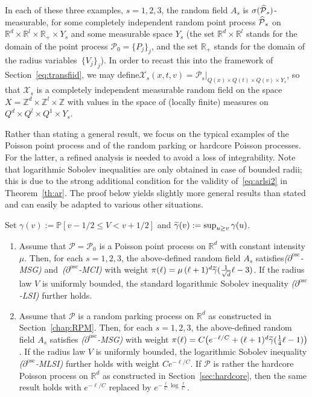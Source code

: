 \documentclass[10pt]{amsart}
\theoremstyle{definition}\newtheorem{defi}[theo]{Definition}\newtheorem{rema}[theo]{Remark}\newtheorem{exam}[theo]{Example}\newtheorem{exem}[theo]{Example}\newtheorem{nota}[theo]{Notation}
\newcommand{\R}{\mathbb R}
\newcommand{\Z}{\mathbb Z}
\newcommand{\p}{\mathbb{P}}
\newcommand{\X}{\mathcal X}
\newcommand{\Pc}{\mathcal P}
\newcommand{\osc}{\partial^{\mathrm{osc}}}
\newcommand*{\romanenumi}{\renewcommand*{\theenumi}{\roman{enumi}}}
\let\oldtilde\tilde
\renewcommand*{\tilde}[1]{\mathchoice{\widetilde{#1}}{\widetilde{#1}}{\oldtilde{#1}}{\oldtilde{#1}}}\let\oldhat\hat
\renewcommand*{\hat}[1]{\mathchoice{\widehat{#1}}{\widehat{#1}}{\oldhat{#1}}{\oldhat{#1}}}\let\oldexists\exists
\renewcommand*{\exists}{\mathrel{\oldexists}}
\begin{document}
In each of these three examples, $s=1,2,3$, the random field $A_s$ is $\sigma(\hat\Pc_s)$-measurable, for some completely independent random point process $\hat\Pc_s$ on $\R^d\times \R^l\times\R_+\times Y_s$ and some measurable space $Y_s$ (the set $\R^d\times\R^l$ stands for the domain of the point process $\Pc_0=\{P_j\}_j$, and the set $\R_+$ stands for the domain of the radius variables~$\{V_j\}_j$). In order to recast this into the framework of Section~\ref{eq:transfiid}, we may define\linebreak$\X_s(x,t,v)=\Pc_s|_{Q(x)\times Q(t)\times Q(v)\times Y_s}$, so that $\X_s$ is a completely independent measurable random field on the space $X=\Z^d\times \Z^l\times\Z$ with values in the space of (locally finite) measures on $Q^d\times Q^l\times Q^1\times Y_s$.


Rather than stating a general result, we focus on the typical examples of the Poisson point process and of the random parking or hardcore Poisson processes. For the latter, a refined analysis is needed to avoid a loss of integrability. Note that logarithmic Sobolev inequalities are only obtained in case of bounded radii; this is due to the strong additional condition for the validity of~\eqref{eq:arlsi2} in Theorem~\ref{th:ar}. The proof below yields slightly more general results than stated and can easily be adapted to various other situations. 


\begin{prop}\label{prop:genincl-loss}
Set $\gamma(v):=\p[v-1/2\le V< v+1/2]$ and $\tilde\gamma(v)\linebreak:=\sup_{u\ge v}\gamma(u)$.
\begin{enumerate}\romanenumi
\item \label{prop3.6.1}Assume that $\Pc=\Pc_0$ is a Poisson point process on $\R^d$ with constant intensity $\mu$. Then, for each $s=1,2,3$, the above-defined random field $A_s$ satisfies\linebreak\emph{($\osc$-MSG)} and~\emph{($\osc$-MCI)} with weight $\pi(\ell)=\mu\,(\ell+1)^d\tilde\gamma(\frac1{\sqrt d}\ell-3)$. If the radius law $V$ is uniformly bounded, the standard logarithmic Sobolev inequality \emph{($\osc$-LSI)} further holds.%
\item \label{prop3.6.2}Assume that $\Pc$ is a random parking process on $\R^d$ as constructed in Section~\ref{chap:RPM}. Then, for each $s=1,2,3$, the above-defined random field $A_s$ satisfies \emph{($\osc$-MSG)} with weight $\pi(\ell)=C\big(e^{-\ell/C}+(\ell+1)^d\tilde\gamma(\frac14\ell-1)\big)$. If the radius law $V$ is uniformly bounded, the logarithmic Sobolev inequality \emph{($\osc$-MLSI)} further holds with weight $Ce^{-\ell/C}$. If $\Pc$ is rather the hardcore Poisson process on $\R^d$ as constructed in Section~\ref{sec:hardcore}, then the same result holds with $e^{-\ell/C}$ replaced by $e^{-\frac\ell C\log\frac\ell C}$.

\end{enumerate}
\end{prop}
\end{document}
